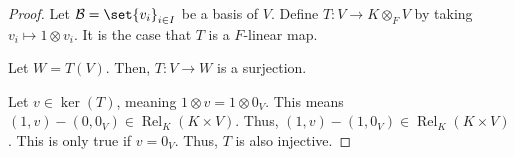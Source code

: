 \documentclass[10pt]{mypackage}
\begin{document}
\begin{proof}
  Let $\mathcal{B} = \set{v_i}_{i\in I}$ be a basis of $V$. Define $T: V\rightarrow K\otimes_{F}V$ by taking $v_i \mapsto 1\otimes v_i$. It is the case that $T$ is a $F$-linear map.\newline

  Let $W = T\left(V\right)$. Then, $T: V\rightarrow W$ is a surjection.\newline

  Let $v\in \ker\left(T\right)$, meaning $1\otimes v = 1\otimes 0_V$. This means $\left(1,v\right) - \left(0,0_V\right) \in \operatorname{Rel}_{K}\left(K\times V\right)$. Thus, $\left(1,v\right) - \left(1,0_V\right)\in \operatorname{Rel}_{K}\left(K\times V\right)$. This is only true if $v = 0_V$. Thus, $T$ is also injective.
\end{proof}
\end{document}
